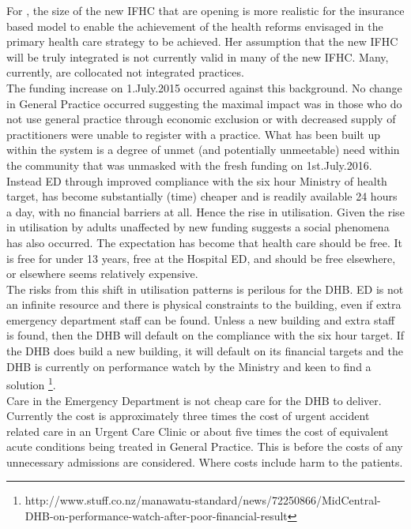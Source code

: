 \documentclass[11pt,a4paper]{article}
\begin{document}
For \citet{howell2005restructuring}, the size of the new IFHC that are opening is more realistic for the insurance based model to enable the achievement of the health reforms envisaged in the primary health care strategy to be achieved. Her assumption that the new IFHC will be truly integrated is not currently valid in many of the new IFHC. Many, currently, are collocated not integrated practices.\\

The funding increase on 1.July.2015 occurred against this background. No change in General Practice occurred suggesting the maximal impact was in those who do not use general practice through economic exclusion or with decreased supply of practitioners were unable to register with a practice. What has been built up within the system is a degree of unmet (and potentially unmeetable) need within the community that was unmasked with the fresh funding on 1st.July.2016.\\

Instead ED through improved compliance with the six hour Ministry of health target, has become substantially (time) cheaper and is readily available 24 hours a day, with no financial barriers at all. Hence the rise in utilisation. Given the rise in utilisation by adults unaffected by new funding suggests a social phenomena has also occurred. The expectation has become that health care should be free. It is free for under 13 years, free at the Hospital ED, and should be free elsewhere, or elsewhere seems relatively expensive. \\

The risks from this shift in utilisation patterns is perilous for the DHB. ED is not an infinite resource and there is physical constraints to the building, even if extra emergency department staff can be found. Unless a new building and extra staff is found, then the DHB will default on the compliance with the six hour target. If the DHB does build a new building, it will default on its financial targets and the DHB is currently on performance watch by the Ministry and keen to find a solution \footnote{http://www.stuff.co.nz/manawatu-standard/news/72250866/MidCentral-DHB-on-performance-watch-after-poor-financial-result}. \\

Care in the Emergency Department is not cheap care for the DHB to deliver. Currently the cost is approximately three times the cost of urgent accident related care in an Urgent Care Clinic or about five times the cost of equivalent acute conditions being treated in General Practice. This is before the costs of any unnecessary admissions are considered. Where costs include harm to the patients.\\
\end{document}
